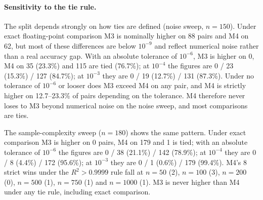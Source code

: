 \documentclass[twoside,11pt]{article}
\newcommand{\Rsq}{R^{2}}
\begin{document}
\paragraph{Sensitivity to the tie rule.}
The split depends strongly on how ties are defined (noise sweep, $n=150$).
Under exact floating-point comparison M3 is nominally higher on 88 pairs and M4 on
62, but most of these differences are below $10^{-9}$ and reflect numerical noise
rather than a real accuracy gap. With an absolute tolerance of $10^{-6}$, M3 is
higher on 0, M4 on 35 (23.3\%) and 115 are tied (76.7\%); at $10^{-4}$ the figures
are 0 / 23 (15.3\%) / 127 (84.7\%); at $10^{-3}$ they are 0 / 19 (12.7\%) /
131 (87.3\%). Under no tolerance of $10^{-6}$ or looser does M3 exceed M4 on any
pair, and M4 is strictly higher on 12.7--23.3\% of pairs depending on the
tolerance. M4 therefore never loses to M3 beyond numerical noise on the noise
sweep, and most comparisons are ties.

The sample-complexity sweep ($n=180$) shows the same pattern. Under exact
comparison M3 is higher on 0 pairs, M4 on 179 and 1 is tied; with an absolute
tolerance of $10^{-6}$ the figures are 0 / 38 (21.1\%) / 142 (78.9\%); at
$10^{-4}$ they are 0 / 8 (4.4\%) / 172 (95.6\%); at $10^{-3}$ they are 0 / 1
(0.6\%) / 179 (99.4\%). M4's 8 strict wins under the $\Rsq>0.9999$ rule fall at
$n=50$ (2), $n=100$ (3), $n=200$ (0), $n=500$ (1), $n=750$ (1) and $n=1000$ (1).
M3 is never higher than M4 under any tie rule, including exact comparison.
\end{document}

